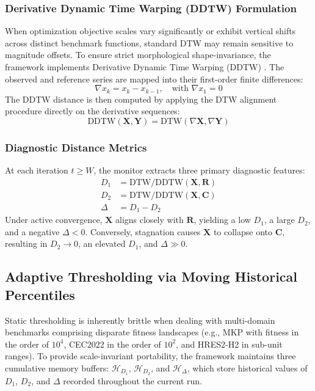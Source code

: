 \subsubsection{Derivative Dynamic Time Warping (DDTW) Formulation}

When optimization objective scales vary significantly or exhibit vertical shifts across distinct benchmark functions, standard DTW may remain sensitive to magnitude offsets. To ensure strict morphological shape-invariance, the framework implements Derivative Dynamic Time Warping (DDTW) \cite{keogh2001derivative}. The observed and reference series are mapped into their first-order finite differences:
\begin{equation}
\nabla x_k = x_k - x_{k-1}, \quad \text{with } \nabla x_1 = 0
\label{eq:derivative_transform}
\end{equation}
The DDTW distance is then computed by applying the DTW alignment procedure directly on the derivative sequences:
\begin{equation}
\text{DDTW}(\mathbf{X}, \mathbf{Y}) = \text{DTW}(\nabla \mathbf{X}, \nabla \mathbf{Y})
\label{eq:ddtw_metric}
\end{equation}

\subsubsection{Diagnostic Distance Metrics}

At each iteration $t \ge W$, the monitor extracts three primary diagnostic features:
\begin{align}
D_1 &= \text{DTW/DDTW}(\mathbf{X}, \mathbf{R}) \label{eq:d1_dist} \\
D_2 &= \text{DTW/DDTW}(\mathbf{X}, \mathbf{C}) \label{eq:d2_dist} \\
\Delta &= D_1 - D_2 \label{eq:delta_metric}
\end{align}
Under active convergence, $\mathbf{X}$ aligns closely with $\mathbf{R}$, yielding a low $D_1$, a large $D_2$, and a negative $\Delta < 0$. Conversely, stagnation causes $\mathbf{X}$ to collapse onto $\mathbf{C}$, resulting in $D_2 \to 0$, an elevated $D_1$, and $\Delta \gg 0$.

\subsection{Adaptive Thresholding via Moving Historical Percentiles}
\label{sec:adaptive_thresholding}

Static thresholding is inherently brittle when dealing with multi-domain benchmarks comprising disparate fitness landscapes (e.g., MKP with fitness in the order of $10^4$, CEC2022 in the order of $10^2$, and HRES2-H2 in sub-unit ranges). To provide scale-invariant portability, the framework maintains three cumulative memory buffers: $\mathcal{H}_{D_1}$, $\mathcal{H}_{D_2}$, and $\mathcal{H}_{\Delta}$, which store historical values of $D_1$, $D_2$, and $\Delta$ recorded throughout the current run.

